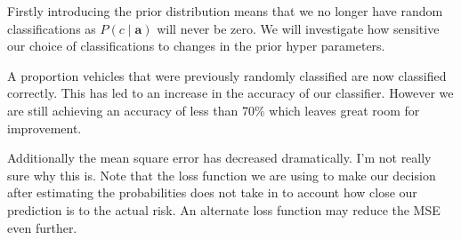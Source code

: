 Firstly introducing the prior distribution means that we no longer have random classifications as $P(c \mid \mathbf{a})$ will never be zero.
We will investigate how sensitive our choice of classifications to changes in the prior hyper parameters.

A proportion vehicles that were previously randomly classified are now classified correctly.
This has led to an increase in the accuracy of our classifier.
However we are still achieving an accuracy of less than 70\% which leaves great room for improvement.

Additionally the mean square error has decreased dramatically.
I'm not really sure why this is.
Note that the loss function we are using to make our decision after estimating the probabilities does not take in to account how close our prediction is to the actual risk.
An alternate loss function may reduce the MSE even further.